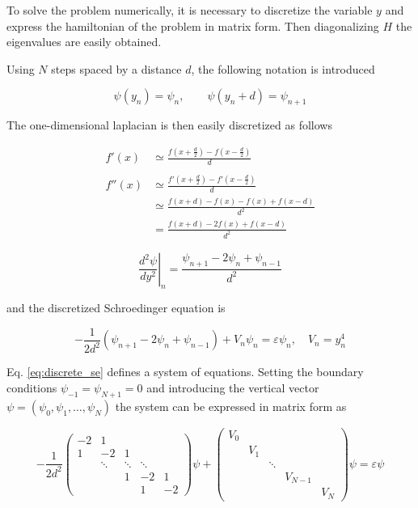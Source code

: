 \documentclass{article}
\begin{document}
To solve the problem numerically, it is necessary to discretize the variable \( y \) and express the hamiltonian of the problem in matrix form. Then diagonalizing \( H \) the eigenvalues are easily obtained.

Using \( N \) steps spaced by a distance \( d \), the following notation is introduced

\[ \psi(y_n) = \psi_n, \qquad \psi(y_n + d) = \psi_{n+1} \]

The one-dimensional laplacian is then easily discretized as follows

\begin{align*}
f'(x) & \simeq \frac{f\left(x+\frac{d}{2}\right) - f\left(x-\frac{d}{2}\right)}{d} \\ \\
f''(x) & \simeq \frac{f'\left(x+\frac{d}{2}\right) - f'\left(x-\frac{d}{2}\right)}{d} \\
& \simeq \frac{f\left(x+d\right) - f(x) - f(x) + f\left(x-d\right)}{d^2} \\
& = \frac{f(x+d) - 2f(x) + f(x-d)}{d^2}
\end{align*}

\begin{equation}
\left. \frac{d^2\psi}{dy^2} \right\vert_n = \frac{\psi_{n+1} - 2\psi_n + \psi_{n-1}}{d^2}
\end{equation}

and the discretized Schroedinger equation is

\begin{equation}
\label{eq:discrete_se}
-\frac{1}{2d^2} \left( \psi_{n+1} - 2\psi_n + \psi_{n-1} \right) + V_n \psi_n = \varepsilon \psi_n, \quad V_n = y_n^4
\end{equation}

Eq. \eqref{eq:discrete_se} defines a system of equations. Setting the boundary conditions \( \psi_{-1} = \psi_{N+1} = 0 \) and introducing the vertical vector \( \psi = (\psi_0, \psi_1, \dots, \psi_N) \) the system can be expressed in matrix form as

\begin{equation}
-\frac{1}{2d^2}
  \begin{pmatrix}
    -2 & 1 &&& \\
    1 & -2 & 1 && \\
    & \ddots & \ddots & \ddots & \\
    && 1 & -2 & 1 \\
    &&& 1 & -2
  \end{pmatrix}
\psi +
  \begin{pmatrix}
    V_0 \\
    & V_1 \\
    && \ddots \\
    &&& V_{N-1} \\
    &&&& V_N
  \end{pmatrix}
\psi = \varepsilon \psi
\end{equation}
\end{document}
